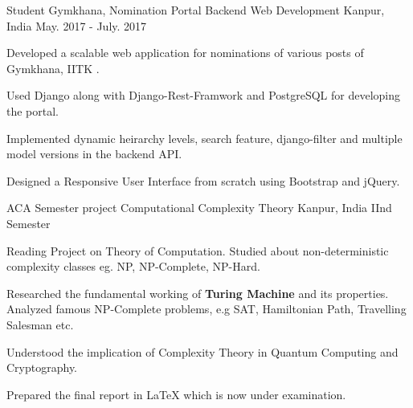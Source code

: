 \begin{cventries}
  \cventry
    {Student Gymkhana, Nomination Portal}
    {Backend Web Development}
    {Kanpur, India}
    {May. 2017 - July. 2017}
    {
      \begin{cvitems}
          \item Developed a scalable web application for nominations of various posts of Gymkhana, IITK .
  \item Used Django along with Django-Rest-Framwork and PostgreSQL for developing the portal.  
  \item	Implemented dynamic heirarchy levels, search feature, django-filter and multiple model versions in the backend API.
  \item Designed a Responsive User Interface from scratch using Bootstrap and jQuery.
      \end{cvitems}
    }
  \cventry
    {ACA Semester project}
    {Computational Complexity Theory}
    {Kanpur, India}
    {IInd Semester}
    {
      \begin{cvitems}
         \item Reading Project on Theory of Computation. Studied about non-deterministic complexity classes eg. NP, NP-Complete, NP-Hard.
  \item Researched the fundamental working of \textbf{Turing Machine} and its properties. Analyzed famous NP-Complete problems, e.g SAT, Hamiltonian Path, Travelling Salesman etc. 
  \item Understood the implication of Complexity Theory in Quantum Computing and Cryptography.
  \item Prepared the final report in \LaTeX{} which is now under examination. 
      \end{cvitems}
    }
\end{cventries}
